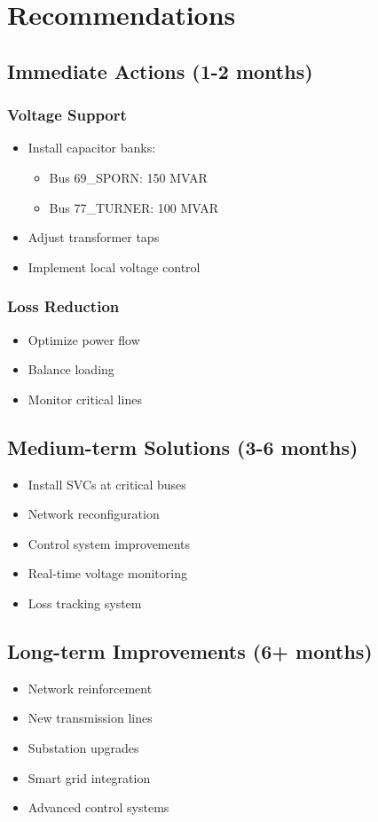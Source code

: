 \documentclass[11pt]{article}
\begin{document}
\section{Recommendations}

\subsection{Immediate Actions (1-2 months)}
\subsubsection{Voltage Support}
\begin{itemize}
    \item Install capacitor banks:
    \begin{itemize}
        \item Bus 69\_SPORN: 150 MVAR
        \item Bus 77\_TURNER: 100 MVAR
    \end{itemize}
    \item Adjust transformer taps
    \item Implement local voltage control
\end{itemize}

\subsubsection{Loss Reduction}
\begin{itemize}
    \item Optimize power flow
    \item Balance loading
    \item Monitor critical lines
\end{itemize}

\subsection{Medium-term Solutions (3-6 months)}
\begin{itemize}
    \item Install SVCs at critical buses
    \item Network reconfiguration
    \item Control system improvements
    \item Real-time voltage monitoring
    \item Loss tracking system
\end{itemize}

\subsection{Long-term Improvements (6+ months)}
\begin{itemize}
    \item Network reinforcement
    \item New transmission lines
    \item Substation upgrades
    \item Smart grid integration
    \item Advanced control systems
\end{itemize}
\end{document}
